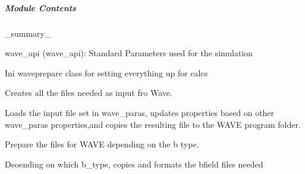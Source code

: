\documentclass[letterpaper,10pt,english]{sphinxmanual}
\begin{document}
\subparagraph{Module Contents}
\label{\detokenize{autoapi/unduwave/wave_modules/wave_prepare/index:module-contents}}

\begin{fulllineitems}
\label{\detokenize{autoapi/unduwave/wave_modules/wave_prepare/index:unduwave.wave_modules.wave_prepare.wave_prepare}}
\pysigstartsignatures
{}
\pysigstopsignatures
\sphinxAtStartPar
\_summary\_
\begin{description}
\sphinxAtStartPar
wave\_api (wave\_api): Standard Parameters used for the simulation

\end{description}

\sphinxAtStartPar
Ini wave\sphinxhyphen{}prepare class for setting everything up for calcs

\begin{fulllineitems}
\label{\detokenize{autoapi/unduwave/wave_modules/wave_prepare/index:unduwave.wave_modules.wave_prepare.wave_prepare.create_wave_input}}
\pysigstartsignatures
{}
\pysigstopsignatures
\sphinxAtStartPar
Creates all the files needed as input fro Wave.

\sphinxAtStartPar
Loads the input file set in wave\_paras, updates properties
based on other wave\_paras properties,and copies the
resulting file to the WAVE program folder.

\end{fulllineitems}


\begin{fulllineitems}
\label{\detokenize{autoapi/unduwave/wave_modules/wave_prepare/index:unduwave.wave_modules.wave_prepare.wave_prepare.prepare_b_files_for_wave}}
\pysigstartsignatures
{}
\pysigstopsignatures
\sphinxAtStartPar
Prepare the files for WAVE depending on the b type.

\sphinxAtStartPar
Deoending on which b\_type, copies and
formats the b\sphinxhyphen{}field files needed

\end{fulllineitems}


\end{fulllineitems}
\end{document}
